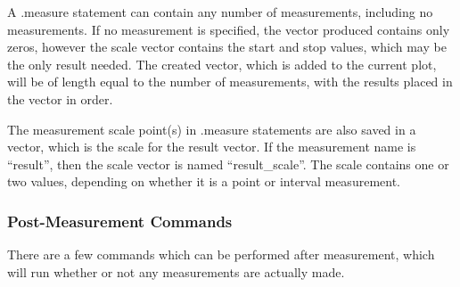 A {\vt .measure} statement can contain any number of measurements,
including no measurements.  If no measurement is specified, the vector
produced contains only zeros, however the scale vector contains the
start and stop values, which may be the only result needed.  The
created vector, which is added to the current plot, will be of length
equal to the number of measurements, with the results placed in the
vector in order.

The measurement scale point(s) in {\vt .measure} statements are also
saved in a vector, which is the scale for the result vector.  If the
measurement name is ``{\vt result}'', then the scale vector is named
``{\vt result\_scale}''.  The scale contains one or two values,
depending on whether it is a point or interval measurement.

\subsubsection{Post-Measurement Commands}

There are a few commands which can be performed after measurement,
which will run whether or not any measurements are actually made.

